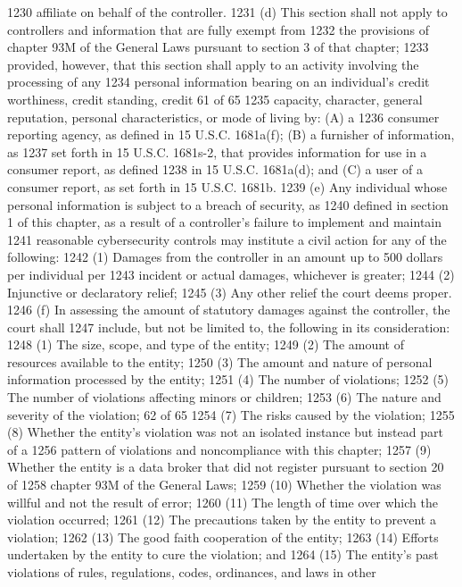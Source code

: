 1230 affiliate on behalf of the controller.
1231 (d) This section shall not apply to controllers and information that are fully exempt from
1232 the provisions of chapter 93M of the General Laws pursuant to section 3 of that chapter;
1233 provided, however, that this section shall apply to an activity involving the processing of any
1234 personal information bearing on an individual’s credit worthiness, credit standing, credit
61 of 65
1235 capacity, character, general reputation, personal characteristics, or mode of living by: (A) a
1236 consumer reporting agency, as defined in 15 U.S.C. 1681a(f); (B) a furnisher of information, as
1237 set forth in 15 U.S.C. 1681s-2, that provides information for use in a consumer report, as defined
1238 in 15 U.S.C. 1681a(d); and (C) a user of a consumer report, as set forth in 15 U.S.C. 1681b.
1239 (e) Any individual whose personal information is subject to a breach of security, as
1240 defined in section 1 of this chapter, as a result of a controller’s failure to implement and maintain
1241 reasonable cybersecurity controls may institute a civil action for any of the following:
1242 (1) Damages from the controller in an amount up to 500 dollars per individual per
1243 incident or actual damages, whichever is greater;
1244 (2) Injunctive or declaratory relief;
1245 (3) Any other relief the court deems proper.
1246 (f) In assessing the amount of statutory damages against the controller, the court shall
1247 include, but not be limited to, the following in its consideration:
1248 (1) The size, scope, and type of the entity;
1249 (2) The amount of resources available to the entity;
1250 (3) The amount and nature of personal information processed by the entity;
1251 (4) The number of violations;
1252 (5) The number of violations affecting minors or children;
1253 (6) The nature and severity of the violation; 
62 of 65
1254 (7) The risks caused by the violation;
1255 (8) Whether the entity’s violation was not an isolated instance but instead part of a
1256 pattern of violations and noncompliance with this chapter;
1257 (9) Whether the entity is a data broker that did not register pursuant to section 20 of
1258 chapter 93M of the General Laws;
1259 (10) Whether the violation was willful and not the result of error;
1260 (11) The length of time over which the violation occurred;
1261 (12) The precautions taken by the entity to prevent a violation;
1262 (13) The good faith cooperation of the entity;
1263 (14) Efforts undertaken by the entity to cure the violation; and
1264 (15) The entity’s past violations of rules, regulations, codes, ordinances, and laws in other
